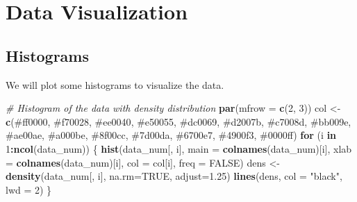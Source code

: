 \documentclass[
]{article}
\newenvironment{Shaded}{\begin{snugshade}}{\end{snugshade}}
\newcommand{\AttributeTok}[1]{\textcolor[rgb]{0.13,0.29,0.53}{#1}}
\newcommand{\CommentTok}[1]{\textcolor[rgb]{0.56,0.35,0.01}{\textit{#1}}}
\newcommand{\ConstantTok}[1]{\textcolor[rgb]{0.56,0.35,0.01}{#1}}
\newcommand{\ControlFlowTok}[1]{\textcolor[rgb]{0.13,0.29,0.53}{\textbf{#1}}}
\newcommand{\DecValTok}[1]{\textcolor[rgb]{0.00,0.00,0.81}{#1}}
\newcommand{\FloatTok}[1]{\textcolor[rgb]{0.00,0.00,0.81}{#1}}
\newcommand{\FunctionTok}[1]{\textcolor[rgb]{0.13,0.29,0.53}{\textbf{#1}}}
\newcommand{\NormalTok}[1]{#1}
\newcommand{\OtherTok}[1]{\textcolor[rgb]{0.56,0.35,0.01}{#1}}
\newcommand{\SpecialCharTok}[1]{\textcolor[rgb]{0.81,0.36,0.00}{\textbf{#1}}}
\newcommand{\StringTok}[1]{\textcolor[rgb]{0.31,0.60,0.02}{#1}}
\begin{document}
\section{Data Visualization}\label{data-visualization}

\subsection{Histograms}\label{histograms}

We will plot some histograms to visualize the data.

\begin{Shaded}
\begin{Highlighting}[]
\CommentTok{\# Histogram of the data with density distribution}
\FunctionTok{par}\NormalTok{(}\AttributeTok{mfrow =} \FunctionTok{c}\NormalTok{(}\DecValTok{2}\NormalTok{, }\DecValTok{3}\NormalTok{))}
\NormalTok{col }\OtherTok{\textless{}{-}} \FunctionTok{c}\NormalTok{(}\StringTok{\textquotesingle{}\#ff0000\textquotesingle{}}\NormalTok{, }\StringTok{\textquotesingle{}\#f70028\textquotesingle{}}\NormalTok{, }\StringTok{\textquotesingle{}\#ee0040\textquotesingle{}}\NormalTok{, }\StringTok{\textquotesingle{}\#e50055\textquotesingle{}}\NormalTok{, }\StringTok{\textquotesingle{}\#dc0069\textquotesingle{}}\NormalTok{,}
         \StringTok{\textquotesingle{}\#d2007b\textquotesingle{}}\NormalTok{, }\StringTok{\textquotesingle{}\#c7008d\textquotesingle{}}\NormalTok{, }\StringTok{\textquotesingle{}\#bb009e\textquotesingle{}}\NormalTok{, }\StringTok{\textquotesingle{}\#ae00ae\textquotesingle{}}\NormalTok{, }\StringTok{\textquotesingle{}\#a000be\textquotesingle{}}\NormalTok{,}
         \StringTok{\textquotesingle{}\#8f00cc\textquotesingle{}}\NormalTok{, }\StringTok{\textquotesingle{}\#7d00da\textquotesingle{}}\NormalTok{, }\StringTok{\textquotesingle{}\#6700e7\textquotesingle{}}\NormalTok{, }\StringTok{\textquotesingle{}\#4900f3\textquotesingle{}}\NormalTok{, }\StringTok{\textquotesingle{}\#0000ff\textquotesingle{}}\NormalTok{)}
\ControlFlowTok{for}\NormalTok{ (i }\ControlFlowTok{in} \DecValTok{1}\SpecialCharTok{:}\FunctionTok{ncol}\NormalTok{(data\_num)) \{}
  \FunctionTok{hist}\NormalTok{(data\_num[, i], }\AttributeTok{main =} \FunctionTok{colnames}\NormalTok{(data\_num)[i],}
       \AttributeTok{xlab =} \FunctionTok{colnames}\NormalTok{(data\_num)[i], }\AttributeTok{col =}\NormalTok{ col[i], }\AttributeTok{freq =} \ConstantTok{FALSE}\NormalTok{)}
\NormalTok{  dens }\OtherTok{\textless{}{-}} \FunctionTok{density}\NormalTok{(data\_num[, i], }\AttributeTok{na.rm=}\ConstantTok{TRUE}\NormalTok{, }\AttributeTok{adjust=}\FloatTok{1.25}\NormalTok{)}
  \FunctionTok{lines}\NormalTok{(dens, }\AttributeTok{col =} \StringTok{"black"}\NormalTok{, }\AttributeTok{lwd =} \DecValTok{2}\NormalTok{)}
\NormalTok{\}}
\end{Highlighting}
\end{Shaded}
\end{document}
